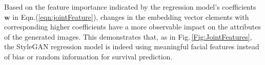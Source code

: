 \documentclass[runningheads]{llncs}
\newcommand{\vw}{\boldsymbol{w}}
\begin{document}
Based on the feature importance indicated by the regression model's coefficients $\vw$ in Eqn.(\ref{eqn:jointFeature}), changes in the embedding vector elements with corresponding higher coefficients have a more observable impact on the attributes of the generated images. This demonstrates that, as in Fig.\,\ref{Fig:JointFeatures}, the StyleGAN regression model is indeed using meaningful facial features instead of bias or random information for survival prediction.
 
 
\end{document}
